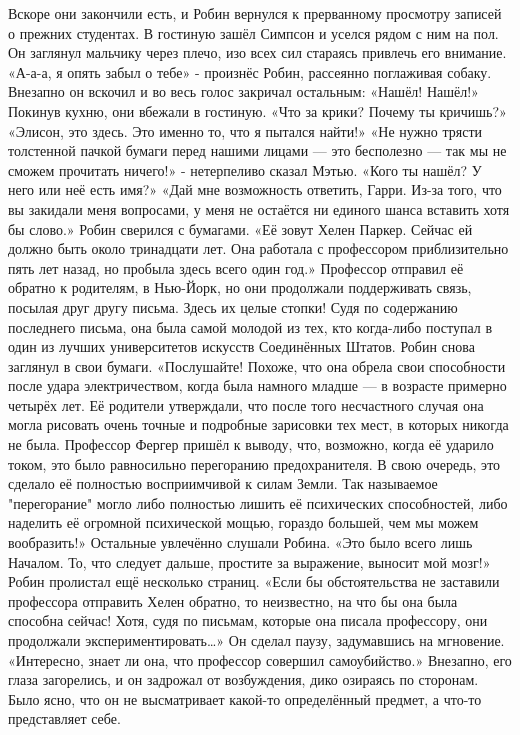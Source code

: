 \documentclass[a4paper,12pt]{book}
\begin{document}
	Вскоре они закончили есть, и Робин вернулся к прерванному просмотру записей о прежних студентах. В гостиную зашёл Симпсон и уселся рядом с ним на пол. Он заглянул мальчику через плечо, изо всех сил стараясь привлечь его внимание.	
	«А-а-а, я опять забыл о тебе» - произнёс Робин, рассеянно поглаживая собаку.
	Внезапно он вскочил и во весь голос закричал остальным:
	«Нашёл! Нашёл!»
	Покинув кухню, они вбежали в гостиную.
	«Что за крики? Почему ты кричишь?»
	«Элисон, это здесь. Это именно то, что я пытался найти!»
	«Не нужно трясти толстенной пачкой бумаги перед нашими лицами — это бесполезно — так мы не сможем прочитать ничего!» - нетерпеливо сказал Мэтью.
	«Кого ты нашёл? У него или неё есть имя?»
	«Дай мне возможность ответить, Гарри. Из-за того, что вы закидали меня вопросами, у меня не остаётся ни единого шанса вставить хотя бы слово.»
	Робин сверился с бумагами.
	«Её зовут Хелен Паркер. Сейчас ей должно быть около тринадцати лет. Она работала с профессором приблизительно пять лет назад, но пробыла здесь всего один год.»
	Профессор отправил её обратно к родителям, в Нью-Йорк, но они продолжали поддерживать связь, посылая друг другу письма. Здесь их целые стопки! Судя по содержанию последнего письма, она была самой молодой из тех, кто когда-либо поступал в один из лучших университетов искусств Соединённых Штатов.
	Робин снова заглянул в свои бумаги.
	«Послушайте! Похоже, что она обрела свои способности после удара электричеством, когда была намного младше — в возрасте примерно четырёх лет. Её родители утверждали, что после того несчастного случая она могла рисовать очень точные и подробные зарисовки тех мест, в которых никогда не была. Профессор Фергер пришёл к выводу, что, возможно, когда её ударило током, это было равносильно перегоранию предохранителя. В свою очередь, это сделало её полностью восприимчивой к силам Земли. Так называемое "перегорание" могло либо полностью лишить её психических способностей, либо наделить её огромной психической мощью, гораздо большей, чем мы можем вообразить!»
	Остальные увлечённо слушали Робина.
	«Это было всего лишь Началом. То, что следует дальше, простите за выражение, выносит мой мозг!»
	Робин пролистал ещё несколько страниц.
	«Если бы обстоятельства не заставили профессора отправить Хелен обратно, то неизвестно, на что бы она была способна сейчас! Хотя, судя по письмам, которые она писала профессору, они продолжали экспериментировать…»
	Он сделал паузу, задумавшись на мгновение.
	«Интересно, знает ли она, что профессор совершил самоубийство.»
	Внезапно, его глаза загорелись, и он задрожал от возбуждения, дико озираясь по сторонам. Было ясно, что он не высматривает какой-то определённый предмет, а что-то представляет себе.
\end{document}
